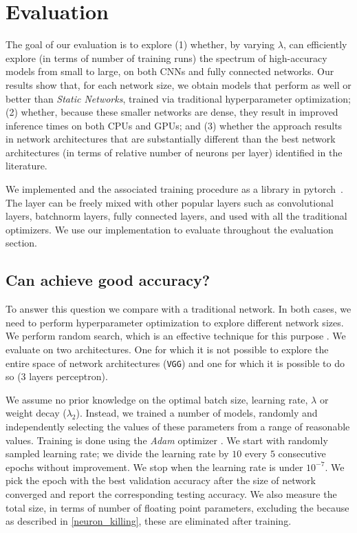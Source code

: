 \section{Evaluation}

The goal of our evaluation is to explore (1) whether, by varying $\lambda$,
\shrink can efficiently explore (in terms of number of training runs)  the
spectrum of high-accuracy models from small to large, on both CNNs and fully
connected networks.  Our results show that, for each network size, we obtain
models that perform as well or better than \textit{Static Networks}, trained via
traditional hyperparameter optimization;  (2) whether, because these  smaller
networks are dense, they result in improved inference times on both CPUs and
GPUs; and (3) whether the \shrink approach results in network architectures that
are substantially different than the best network architectures (in terms of
relative number of neurons per layer) identified in the literature.

We implemented \swls and
the associated training procedure as a library in
pytorch~\cite{paszke2017automatic}. The layer can be freely mixed with other
popular layers such as convolutional layers, batchnorm layers, fully connected
layers, and used with all the traditional optimizers. We use our implementation
to evaluate \shrink throughout the evaluation section.

\subsection{Can \shrink achieve good accuracy?}

To answer this question we compare \shrink with a traditional network. In both
cases, we need to perform hyperparameter optimization to explore different
network sizes. We perform random search, which is an effective technique
for this purpose \cite{BergstraJAMESBERGSTRA2012}. We evaluate \shrink on two
architectures. One for which it is not possible to explore the entire
space of network architectures (\texttt{VGG}) and one for which it is
possible to do so (3 layers perceptron).

We assume no prior knowledge on the optimal batch
size, learning rate, $\lambda$ or weight decay ($\lambda_2$). Instead, we
trained a number of models, randomly and independently selecting the values of
these parameters from a range of reasonable values. Training is done using the
\textit{Adam} optimizer \cite{DBLP:journals/corr/KingmaB14}. We start with
randomly sampled learning rate; we divide the learning rate by $10$ every $5$
consecutive epochs without improvement. We stop when the learning rate is under
$10^{-7}$.  We pick the epoch with the best validation accuracy after the size
of network converged and report the corresponding testing accuracy. We also
measure the total size, in terms of number of floating point parameters,
excluding the \swls because as described in \cref{neuron_killing}, these are
eliminated after training.

